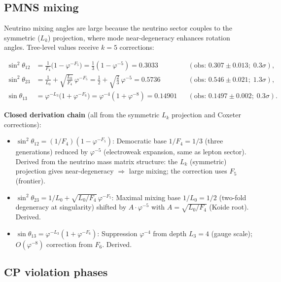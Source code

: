 \documentclass[12pt,a4paper]{article}
\begin{document}
\subsection{PMNS mixing}
\label{sec:pmns}

Neutrino mixing angles are large because the neutrino sector couples to the symmetric ($L_k$) projection, where mode near-degeneracy enhances rotation angles. Tree-level values receive $k = 5$ corrections:

\begin{align}
\sin^2\theta_{12} &= \frac{1}{F_4}\bigl(1 - \varphi^{-F_5}\bigr) = \frac{1}{3}(1 - \varphi^{-5}) = 0.3033 && (\text{obs: } 0.307 \pm 0.013;\; 0.3\sigma), \label{eq:pmns12}\\
\sin^2\theta_{23} &= \frac{1}{L_0} + \sqrt{\frac{L_0}{F_4}}\,\varphi^{-F_5} = \frac{1}{2} + \sqrt{\frac{2}{3}}\,\varphi^{-5} = 0.5736 && (\text{obs: } 0.546 \pm 0.021;\; 1.3\sigma), \label{eq:pmns23}\\
\sin\theta_{13} &= \varphi^{-L_3}\bigl(1 + \varphi^{-F_6}\bigr) = \varphi^{-4}(1 + \varphi^{-8}) = 0.14901 && (\text{obs: } 0.1497 \pm 0.002;\; 0.3\sigma). \label{eq:pmns13}
\end{align}

\noindent\textbf{Closed derivation chain} (all from the symmetric $L_k$ projection and Coxeter corrections):
\begin{itemize}
\item $\sin^2\theta_{12} = (1/F_4)(1 - \varphi^{-F_5})$: Democratic base $1/F_4 = 1/3$ (three generations) reduced by $\varphi^{-5}$ (electroweak expansion, same as lepton sector). Derived from the neutrino mass matrix structure: the $L_k$ (symmetric) projection gives near-degeneracy $\Rightarrow$ large mixing; the correction uses $F_5$ (frontier).
\item $\sin^2\theta_{23} = 1/L_0 + \sqrt{L_0/F_4}\,\varphi^{-F_5}$: Maximal mixing base $1/L_0 = 1/2$ (two-fold degeneracy at singularity) shifted by $A \cdot \varphi^{-5}$ with $A = \sqrt{L_0/F_4}$ (Koide root). Derived.
\item $\sin\theta_{13} = \varphi^{-L_3}(1 + \varphi^{-F_6})$: Suppression $\varphi^{-4}$ from depth $L_3 = 4$ (gauge scale); $O(\varphi^{-8})$ correction from $F_6$. Derived.
\end{itemize}

\subsection{CP violation phases}
\label{sec:cp}
\end{document}
